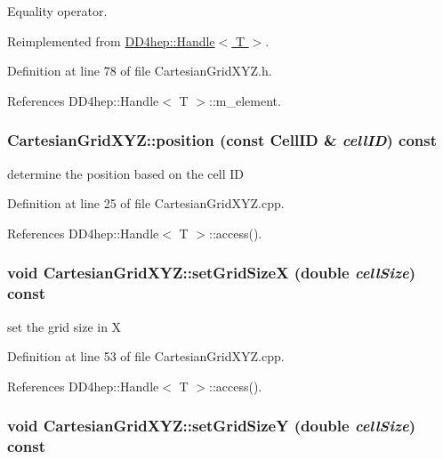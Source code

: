 Equality operator. 

Reimplemented from \hyperlink{class_d_d4hep_1_1_handle_a618470283b3a2cc5ed0545fec90dc759}{DD4hep::Handle$<$ T $>$}.

Definition at line 78 of file CartesianGridXYZ.h.

References DD4hep::Handle$<$ T $>$::m\_\-element.\hypertarget{class_d_d4hep_1_1_geometry_1_1_cartesian_grid_x_y_z_a4afc0aea9df70160b0ff05220fd833ec}{
\subsubsection[{position}]{ CartesianGridXYZ::position (const CellID \& {\em cellID}) const}}
\label{class_d_d4hep_1_1_geometry_1_1_cartesian_grid_x_y_z_a4afc0aea9df70160b0ff05220fd833ec}


determine the position based on the cell ID 

Definition at line 25 of file CartesianGridXYZ.cpp.

References DD4hep::Handle$<$ T $>$::access().\hypertarget{class_d_d4hep_1_1_geometry_1_1_cartesian_grid_x_y_z_ad46064a7fa3c563a4287e07706305484}{
\subsubsection[{setGridSizeX}]{\setlength{\rightskip}{0pt plus 5cm}void CartesianGridXYZ::setGridSizeX (double {\em cellSize}) const}}
\label{class_d_d4hep_1_1_geometry_1_1_cartesian_grid_x_y_z_ad46064a7fa3c563a4287e07706305484}


set the grid size in X 

Definition at line 53 of file CartesianGridXYZ.cpp.

References DD4hep::Handle$<$ T $>$::access().\hypertarget{class_d_d4hep_1_1_geometry_1_1_cartesian_grid_x_y_z_a80f4136e55f603d6fdfe77856cabdd97}{
\subsubsection[{setGridSizeY}]{\setlength{\rightskip}{0pt plus 5cm}void CartesianGridXYZ::setGridSizeY (double {\em cellSize}) const}}
\label{class_d_d4hep_1_1_geometry_1_1_cartesian_grid_x_y_z_a80f4136e55f603d6fdfe77856cabdd97}


